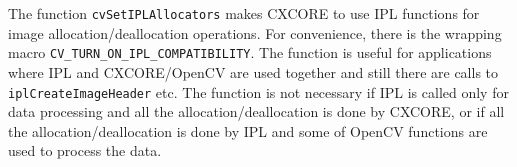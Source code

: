 
\begin{description}
\end{description}


The function \texttt{cvSetIPLAllocators} makes CXCORE to use IPL functions
for image allocation/deallocation operations. For convenience, there
is the wrapping macro \texttt{CV\_TURN\_ON\_IPL\_COMPATIBILITY}. The
function is useful for applications where IPL and CXCORE/OpenCV are used
together and still there are calls to \texttt{iplCreateImageHeader}
etc. The function is not necessary if IPL is called only for data
processing and all the allocation/deallocation is done by CXCORE, or
if all the allocation/deallocation is done by IPL and some of OpenCV
functions are used to process the data.
